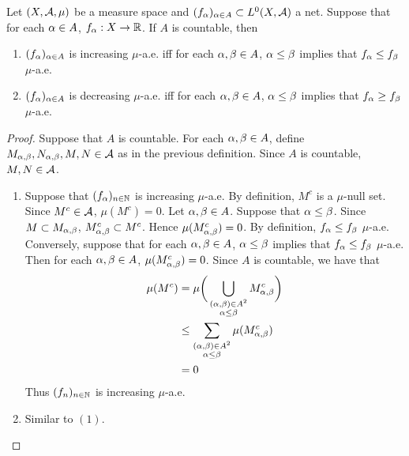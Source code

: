 \documentclass{book}
\begin{document}
\begin{ex} 
	Let $(X, \mathcal{A}, \mu)$ be a measure space and $(f_\alpha)_{\alpha \in A} \subset L^0(X, \mathcal{A})$ a net. Suppose that for each $\alpha \in A$, $f_{\alpha}:X \rightarrow \mathbb{R}$. If $A$ is countable, then 
	\begin{enumerate}
		\item $(f_\alpha)_{\alpha \in A}$ is increasing $\mu$-a.e. iff for each $\alpha, \beta \in A$, $\alpha \leq \beta$ implies that $f_{\alpha} \leq f_{\beta}$ $\mu$-a.e.
		\item $(f_\alpha)_{\alpha \in A}$ is decreasing $\mu$-a.e. iff for each $\alpha, \beta \in A$, $\alpha \leq \beta$ implies that $f_{\alpha} \geq f_{\beta}$ $\mu$-a.e.
	\end{enumerate}
\end{ex}

\begin{proof} Suppose that $A$ is countable. For each $\alpha, \beta \in A$, define $M_{\alpha, \beta},N_{\alpha, \beta},M,N \in \mathcal{A}$ as in the previous definition. Since $A$ is countable, $M,N \in \mathcal{A}$. 
	\begin{enumerate}
		\item Suppose that $(f_{\alpha})_{n \in \mathbb{N}}$ is increasing $\mu$-a.e. By definition, $M^c$ is a $\mu$-null set. Since $M^c \in \mathcal{A}$, $\mu(M^c) = 0$. Let $\alpha, \beta \in A$. Suppose that $\alpha \leq \beta$. Since $M \subset M_{\alpha, \beta}$, $M_{\alpha, \beta}^c \subset M^c$. Hence $\mu(M_{\alpha, \beta}^c) = 0$. By definition, $f_{\alpha} \leq f_{\beta}$ $\mu$-a.e.\\
		Conversely, suppose that for each $\alpha, \beta \in A$, $\alpha \leq \beta$ implies that $f_{\alpha} \leq f_{\beta}$ $\mu$-a.e. Then for each $\alpha, \beta \in A$, $\mu(M_{\alpha, \beta}^c) = 0$. Since $A$ is countable, we have that
		\begin{align*}
			\mu(M^c) 
			& = \mu \bigg( \bigcup\limits_{\substack{(\alpha, \beta) \in A^2 \\ \alpha \leq \beta}} M_{\alpha, \beta}^c \bigg) \\
			& \leq \sum\limits_{\substack{(\alpha, \beta) \in A^2 \\ \alpha \leq \beta}} \mu(M_{\alpha, \beta}^c) \\
			& = 0
		\end{align*}
		Thus $(f_n)_{n \in \mathbb{N}}$ is increasing $\mu$-a.e.
		\item Similar to $(1)$.
	\end{enumerate}
\end{proof}
\end{document}
